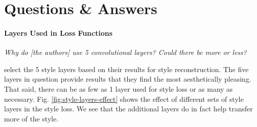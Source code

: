 \documentclass{article}
\begin{document}
\section{Questions \& Answers}

\paragraph{Layers Used in Loss Functions} \textit{Why do [the authors] use 5
convolutional layers? Could there be more or less?}

\cite{2015arXiv150806576G} select the 5 style layers based on their results
for style reconstruction. The five layers in question provide results that
they find the most aesthetically pleasing. That said, there can be as few as
1 layer used for style loss or as many as necessary. Fig.
\ref{fig:style-layers-effect} shows the effect of different sets of style
layers in the style loss. We see that the additional layers do in fact help
transfer more of the style.
\end{document}
